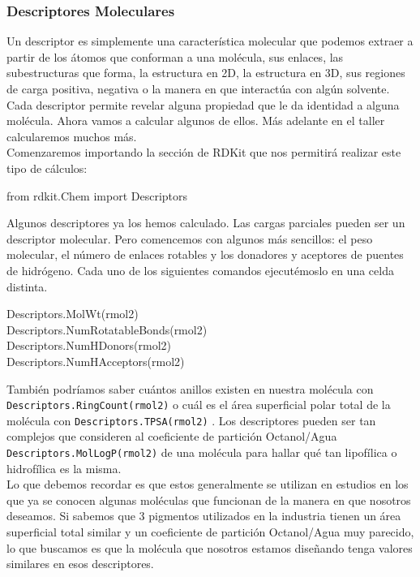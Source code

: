 \documentclass[10pt,letterpaper]{article}
\newcommand{\inlinecode}[1]{
\colorbox{light-gray}{\texttt{#1}}
}
\newenvironment{Code}
{
\begin{lrbox}{\selvestebox}%
\begin{minipage}{\dimexpr\columnwidth-2\fboxsep\relax}
\fontfamily{\ttdefault}\selectfont
}
{\end{minipage}\end{lrbox}%
\begin{center}
\colorbox{light-gray}{\usebox{\selvestebox}}
\end{center}
}
\begin{document}
\subsubsection{Descriptores Moleculares}

Un descriptor es simplemente una caracter\'istica molecular que podemos extraer a partir de los \'atomos que conforman a una mol\'ecula, sus enlaces, las subestructuras que forma, la estructura en 2D, la estructura en 3D, sus regiones de carga positiva, negativa o la manera en que interact\'ua con alg\'un solvente. Cada descriptor permite revelar alguna propiedad que le da identidad a alguna mol\'ecula. Ahora vamos a calcular algunos de ellos. M\'as adelante en el taller calcularemos muchos m\'as.\\

Comenzaremos importando la secci\'on de RDKit que nos permitir\'a realizar este tipo de c\'alculos:

\begin{Code}
from rdkit.Chem import Descriptors
\end{Code}

Algunos descriptores ya los hemos calculado. Las cargas parciales pueden ser un descriptor molecular. Pero comencemos con algunos m\'as sencillos: el peso molecular, el n\'umero de enlaces rotables y los donadores y aceptores de puentes de hidr\'ogeno. Cada uno de los siguientes comandos ejecut\'emoslo en una celda distinta.

\begin{Code}
Descriptors.MolWt(rmol2)\\
Descriptors.NumRotatableBonds(rmol2)\\
Descriptors.NumHDonors(rmol2)\\
Descriptors.NumHAcceptors(rmol2)
\end{Code}

Tambi\'en podr\'iamos saber cu\'antos anillos existen en nuestra mol\'ecula con \inlinecode{Descriptors.RingCount(rmol2)} o cu\'al es el \'area superficial polar total de la mol\'ecula con \inlinecode{Descriptors.TPSA(rmol2)}. Los descriptores pueden ser tan complejos que consideren al coeficiente de partici\'on Octanol/Agua \inlinecode{Descriptors.MolLogP(rmol2)} de una mol\'ecula para hallar qu\'e tan lipof\'ilica o hidrof\'ilica es la misma.\\

Lo que debemos recordar es que estos generalmente se utilizan en estudios en los que ya se conocen algunas mol\'eculas que funcionan de la manera en que nosotros deseamos. Si sabemos que 3 pigmentos utilizados en la industria tienen un \'area superficial total similar y un coeficiente de partici\'on Octanol/Agua muy parecido, lo que buscamos es que la mol\'ecula que nosotros estamos dise\~nando tenga valores similares en esos descriptores.\\
\end{document}
